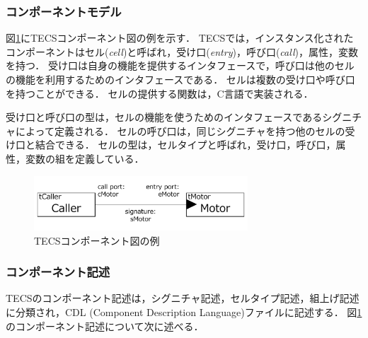 \documentclass[submit,techrep]{ipsj_v2/UTF8/ipsj}
\begin{document}
\subsubsection{コンポーネントモデル}

図\ref{fig:component}にTECSコンポーネント図の例を示す．
TECSでは，インスタンス化されたコンポーネントはセル({\it cell})と呼ばれ，受け口({\it entry})，呼び口({\it call})，属性，変数を持つ．
受け口は自身の機能を提供するインタフェースで，呼び口は他のセルの機能を利用するためのインタフェースである．
セルは複数の受け口や呼び口を持つことができる．
セルの提供する関数は，C言語で実装される．

受け口と呼び口の型は，セルの機能を使うためのインタフェースであるシグニチャによって定義される．
セルの呼び口は，同じシグニチャを持つ他のセルの受け口と結合できる．
セルの型は，セルタイプと呼ばれ，受け口，呼び口，属性，変数の組を定義している．

\begin{figure}[t]
    \centering
    \includegraphics[width=8cm,clip]{figure/component_diagram.pdf}
    \caption{TECSコンポーネント図の例}
    \label{fig:component}
\end{figure}

\subsubsection{コンポーネント記述}
TECSのコンポーネント記述は，シグニチャ記述，セルタイプ記述，組上げ記述に分類され，CDL (Component Description Language)ファイルに記述する．
図\ref{fig:component}のコンポーネント記述について次に述べる．
\end{document}
